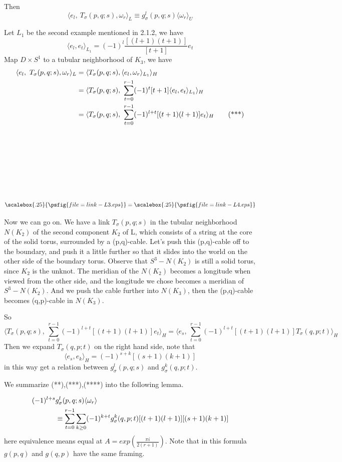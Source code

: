 Then \[\langle e_l,\ T_\sigma(p,q;s),\omega_r\rangle_L\equiv g_\sigma^l(p,q;s)\langle\omega_r\rangle_U\tag {**}\]

Let $L_1$ be the second example mentioned in 2.1.2, we have
\[\langle e_l,e_t\rangle_{L_1}=(-1)^l \frac{[(l+1)(t+1)]}{[t+1]} e_t\]
Map $D \times S^1$ to a tubular neighborhood of $K_3$, we have
\begin{align} \langle e_l,\ T_\sigma(p,q;s),\omega_r\rangle_L&=\langle T_\sigma(p,q;s),\langle e_l,\omega_r\rangle_{L_1}\rangle_H\notag\\
&=\langle T_\sigma(p,q;s),\ \sum_{t=0}^{r-1}
(-1)^t[t+1]\langle e_l,e_t\rangle_{L_1}\rangle_H\notag\\
&=\langle T_\sigma(p,q;s),\ \sum_{t=0}^{r-1} (-1)^{l+t}[(t+1)(l+1)]
e_t\rangle_H\tag {***}
\end{align}

\

\ 

\ 

\ 

\[ \scalebox{.25}{\psfig{file=link-L3.eps}} =
\scalebox{.25}{\psfig{file=link-L4.eps}}
\]

Now we can go on. We have a link $T_\sigma(p,q;s)$ in the tubular neighborhood $N(K_2)$ of the second component $K_2$ of L,
which consists of a string at the core of the solid torus, surrounded by a (p,q)-cable. Let's push this (p,q)-cable off to the
boundary, and push it a little further so that it slides into the world on the other side of the boundary torus. Observe that
$S^3-N(K_2)$ is still a solid torus, since $K_2$ is the unknot. The meridian of the $N(K_2)$ becomes a longitude when viewed
from the other side, and the longitude we chose becomes a meridian of $S^3-N(K_2)$. And we push the cable further into $N(K_3)$,
then the (p,q)-cable becomes (q,p)-cable in $N(K_3)$.


So
\[
\langle T_\sigma(p,q;s),\ \sum_{t=0}^{r-1} (-1)^{l+t}[(t+1)(l+1)]e_t\rangle_H=\langle e_s,\ \sum_{t=0}^{r-1}  (-1)^{l+t}[(t+1)(l+1)]
T_{\sigma}(q,p;t)\rangle_H\tag {****}
\]
Then we expand $T_{\sigma}(q,p;t)$ on the right hand side, note that \[\langle e_s,e_k\rangle_H=(-1)^{s+k}[(s+1)(k+1)]\]
in this way get a relation between $g_\sigma^l(p,q;s)$ and
$g_{\sigma}^k(q,p;t)$.

We summarize (**),(***),(****) into the following lemma.

\begin{lemma}
\begin{align} (-1)^{l+s}&g_\sigma^l(p,q;s)\langle\omega_r\rangle\notag\\
&\equiv \sum_{t=0}^{r-1}\sum_{k\ge 0} (-1)^{k+t}g_{\sigma}^k(q,p;t)[(t+1)(l+1)][(s+1)(k+1)]\notag\end{align}
here equivalence means equal at $A=exp\left(\frac {\pi i}{2(r+1)}\right)$. Note that in this formula $g(p,q)$ and $g(q,p)$ have the same framing.
\end{lemma}

